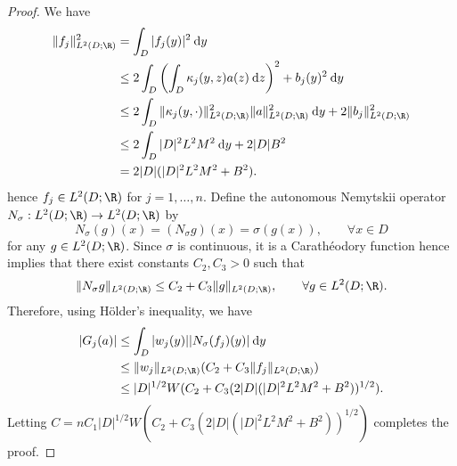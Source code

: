 {\begin{proof}
We have
\begin{align*}
    \|f_j\|_{L^2(D;\R)}^2 &= \int_D |f_j(y)|^2 \: \text{d}y \\
    &\leq 2 \int _D \left ( \int_D \kappa_j(y,z) a(z) \: \text{d}z  \right )^2 + b_j(y)^2 \: \text{d}y \\
    &\leq 2 \int_D \|\kappa_j(y, \cdot)\|_{L^2(D;\R)}^2 \|a\|_{L^2(D;\R)}^2 \: \text{d} y + 2 \|b_j\|_{L^2(D;\R)}^2 \\
    &\leq 2 \int_D |D|^2 L^2 M^2 \: \text{d}y + 2 |D|B^2 \\
    &= 2|D| (|D|^2 L^2 M^2 + B^2).
\end{align*}
hence \(f_j \in L^2(D;\R)\) for \(j=1,\dots,n\). Define the autonomous Nemytskii operator \(N_\sigma : L^2(D;\R) \to L^2(D;\R)\) by
\[N_\sigma (g) (x) = (N_\sigma g)(x) = \sigma(g(x)), \qquad \forall x \in D\]
for any \(g \in L^2(D;\R)\). Since \(\sigma\) is continuous, it is a Carath{\'e}odory function hence \cite[Corollary 7.20]{dudley2011concrete} implies that there exist constants \(C_2, C_3 > 0\) such that
\[\|N_\sigma g\|_{L^2(D;\R)} \leq C_2 + C_3 \|g\|_{L^2(D;\R)}, \qquad \forall g \in L^2(D;\R).\]
Therefore, using H{\"o}lder's inequality, we have
\begin{align*}
    |G_j(a)| &\leq \int_D |w_j(y)| | N_\sigma(f_j)(y)| \: \text{d}y \\
    &\leq \|w_j\|_{L^2(D;\R)}(C_2 + C_3\|f_j\|_{L^2(D;\R)}) \\
    &\leq |D|^{1/2} W (C_2 + C_3( 2|D| (|D|^2 L^2 M^2 + B^2))^{1/2}).
\end{align*}
Letting \(C = nC_1 |D|^{1/2} W (C_2 + C_3( 2|D| (|D|^2 L^2 M^2 + B^2))^{1/2})\) completes the proof.

\end{proof}

\fi


}
